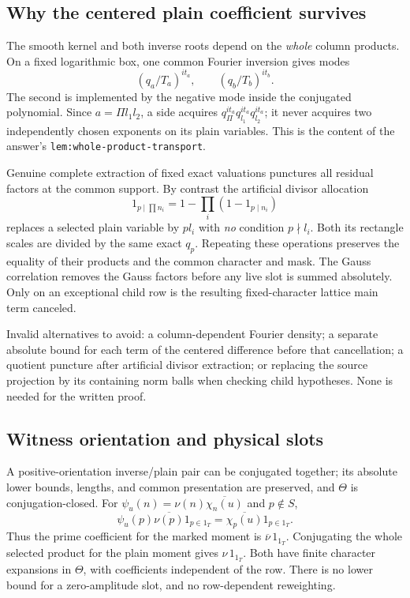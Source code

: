 \documentclass[12pt]{article}
\begin{document}
\subsection{Why the centered plain coefficient survives}
The smooth kernel and both inverse roots depend on the
\emph{whole} column products.  On a fixed logarithmic box, one
common Fourier inversion gives modes
\[
 (q_a/T_a)^{it_a},\qquad (q_b/T_b)^{it_b}.
\]
The second is implemented by the negative mode inside the conjugated
polynomial.  Since \(a=\Pi l_1l_2\), a side acquires
\(q_\Pi^{it_a}q_{l_1}^{it_a}q_{l_2}^{it_a}\); it never acquires
two independently chosen exponents on its plain variables.
This is the content of the answer's
\texttt{lem:whole-product-transport}.

Genuine complete extraction of fixed exact valuations punctures all
residual factors at the common support.  By contrast the artificial
divisor allocation
\[
 1_{p\mid\prod n_i}=1-\prod_i(1-1_{p\mid n_i})
\]
replaces a selected plain variable by \(pl_i\) with \emph{no}
condition \(p\nmid l_i\).  Both its rectangle scales are divided
by the same exact \(q_p\).  Repeating these operations preserves
the equality of their products and the common character and mask.
The Gauss correlation removes the Gauss factors before any live
slot is summed absolutely.  Only on an exceptional child row is
the resulting fixed-character lattice main term canceled.

Invalid alternatives to avoid: a column-dependent Fourier density;
a separate absolute bound for each term of the centered difference
before that cancellation; a quotient puncture after artificial
divisor extraction; or replacing the source projection by its
containing norm balls when checking child hypotheses.
None is needed for the written proof.

\subsection{Witness orientation and physical slots}
A positive-orientation inverse/plain pair can be conjugated together;
its absolute lower bounds, lengths, and common presentation are
preserved, and \(\Theta\) is conjugation-closed.  For
\(\psi_u(n)=\nu(n)\overline{\chi_n(u)}\) and \(p\notin S\),
\[
 \psi_u(p)\overline{\nu(p)}1_{p\in1_T}
       =\overline{\chi_p(u)}1_{p\in1_T}.
\]
Thus the prime coefficient for the marked moment is
\(\overline\nu\,1_{1_T}\).  Conjugating the whole selected product
for the plain moment gives \(\nu\,1_{1_T}\).
Both have finite character expansions in \(\Theta\), with
coefficients independent of the row.  There is no lower bound for
a zero-amplitude slot, and no row-dependent reweighting.
\end{document}
